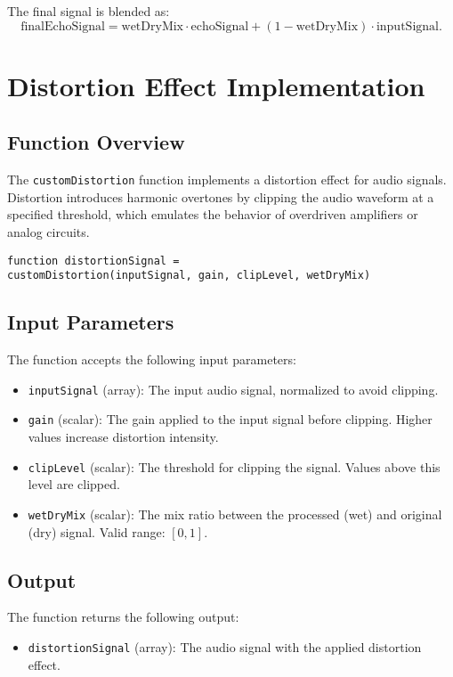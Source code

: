 \documentclass{article}
\begin{document}
The final signal is blended as:
\[
\text{finalEchoSignal} = \text{wetDryMix} \cdot \text{echoSignal} + (1 - \text{wetDryMix}) \cdot \text{inputSignal}.
\]

\section{Distortion Effect Implementation}

\subsection{Function Overview}
The \texttt{customDistortion} function implements a distortion effect for audio signals. Distortion introduces harmonic overtones by clipping the audio waveform at a specified threshold, which emulates the behavior of overdriven amplifiers or analog circuits.

\begin{verbatim}
function distortionSignal =
customDistortion(inputSignal, gain, clipLevel, wetDryMix)
\end{verbatim}

\subsection{Input Parameters}
The function accepts the following input parameters:
\begin{itemize}
    \item \texttt{inputSignal} (array): The input audio signal, normalized to avoid clipping.
    \item \texttt{gain} (scalar): The gain applied to the input signal before clipping. Higher values increase distortion intensity.
    \item \texttt{clipLevel} (scalar): The threshold for clipping the signal. Values above this level are clipped.
    \item \texttt{wetDryMix} (scalar): The mix ratio between the processed (wet) and original (dry) signal. Valid range: $[0, 1]$.
\end{itemize}

\subsection{Output}
The function returns the following output:
\begin{itemize}
    \item \texttt{distortionSignal} (array): The audio signal with the applied distortion effect.
\end{itemize}
\end{document}
